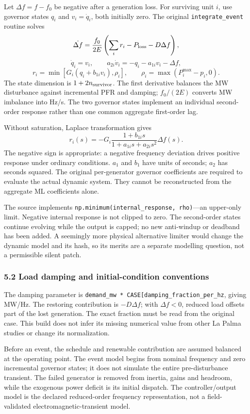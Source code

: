 \documentclass[
  11pt,
  a4paper,
]{article}
\begin{document}
Let \(\Delta f=f-f_0\) be negative after a generation loss. For
surviving unit \(i\), use governor states \(q_i\) and \(v_i=\dot q_i\),
both initially zero. The original \texttt{integrate\_event} routine
solves \[
\dot{\Delta f}=\frac{f_0}{2E}\left(\sum_i r_i-P_{\rm loss}-D\Delta f\right),
\] \[
\dot q_i=v_i,\qquad a_{2i}\dot v_i=-q_i-a_{1i}v_i-\Delta f,
\] \[
r_i=\min\left[G_i(q_i+b_{1i}v_i),\rho_i\right],\qquad
\rho_i=\max(P_i^{\max}-p_i,0).
\] The state dimension is \(1+2n_{\rm survivor}\). The first derivative
balances the MW disturbance against incremental PFR and damping;
\(f_0/(2E)\) converts MW imbalance into Hz/s. The two governor states
implement an individual second-order response rather than one common
aggregate first-order lag.

Without saturation, Laplace transformation gives \[
r_i(s)=-G_i\frac{1+b_{1i}s}{1+a_{1i}s+a_{2i}s^2}\Delta f(s).
\] The negative sign is appropriate: a negative frequency deviation
drives positive response under ordinary conditions. \(a_1\) and \(b_1\)
have units of seconds; \(a_2\) has seconds squared. The original
per-generator governor coefficients are required to evaluate the actual
dynamic system. They cannot be reconstructed from the aggregate ML
coefficients alone.

The source implements \texttt{np.minimum(internal\_response,\ rho)}---an
upper-only limit. Negative internal response is not clipped to zero. The
second-order states continue evolving while the output is capped; no new
anti-windup or deadband has been added. A seemingly more physical
alternative limiter would change the dynamic model and its hash, so its
merits are a separate modelling question, not a permissible silent
patch.

\subsubsection{5.2 Load damping and initial-condition
conventions}\label{load-damping-and-initial-condition-conventions}

The damping parameter is
\texttt{demand\_mw\ *\ CASE{[}\textquotesingle{}damping\_fraction\_per\_hz\textquotesingle{}{]}},
giving MW/Hz. The restoring contribution is \(-D\Delta f\); with
\(\Delta f<0\), reduced load offsets part of the lost generation. The
exact fraction must be read from the original case. This build does not
infer its missing numerical value from other La Palma studies or change
its normalization.

Before an event, the schedule and renewable contribution are assumed
balanced at the operating point. The event model begins from nominal
frequency and zero incremental governor states; it does not simulate the
entire pre-disturbance transient. The failed generator is removed from
inertia, gains and headroom, while the exogenous power deficit is its
initial dispatch. The controller/output model is the declared
reduced-order frequency representation, not a field-validated
electromagnetic-transient model.
\end{document}
